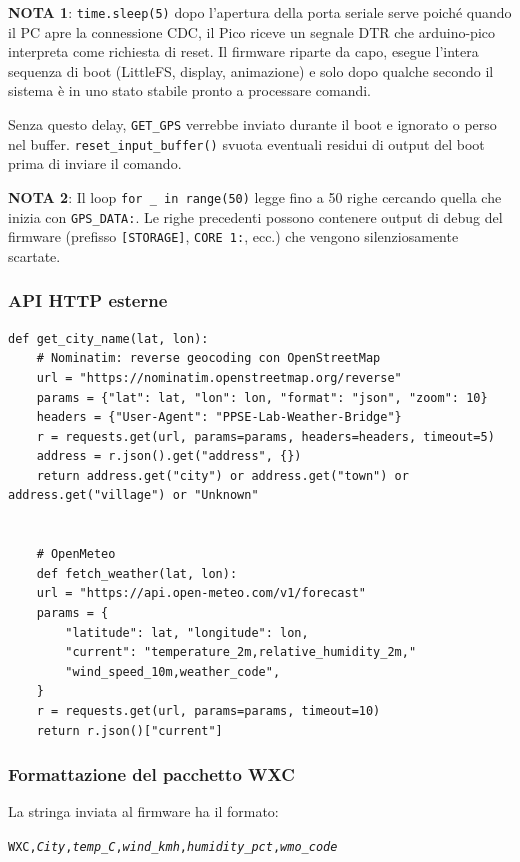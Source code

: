\textbf{NOTA 1}: \texttt{time.sleep(5)} dopo l'apertura della porta seriale serve poiché
quando il PC apre la connessione CDC, il Pico riceve un segnale DTR che
arduino-pico interpreta come richiesta di reset. Il firmware riparte da capo,
esegue l'intera sequenza di boot (LittleFS, display, animazione) e solo dopo
qualche secondo il sistema è in uno stato stabile pronto a processare comandi.


Senza questo delay, \texttt{GET\_GPS} verrebbe inviato durante il boot e
ignorato o perso nel buffer.
\texttt{reset\_input\_buffer()} svuota
eventuali residui di output del boot prima di inviare il comando.


\textbf{NOTA 2}: Il loop \texttt{for \_ in range(50)} legge fino a 50 righe cercando quella
che inizia con \texttt{GPS\_DATA:}. Le righe precedenti possono contenere
output di debug del firmware (prefisso \texttt{[STORAGE]}, \texttt{CORE 1:},
ecc.) che vengono silenziosamente scartate. 

\subsubsection{API HTTP esterne}

\begin{lstlisting}[style=py, caption={pcb\_bridge.py --- geocoding e meteo}]
	def get_city_name(lat, lon):
	# Nominatim: reverse geocoding con OpenStreetMap
	url = "https://nominatim.openstreetmap.org/reverse"
	params = {"lat": lat, "lon": lon, "format": "json", "zoom": 10}
	headers = {"User-Agent": "PPSE-Lab-Weather-Bridge"}
	r = requests.get(url, params=params, headers=headers, timeout=5)
	address = r.json().get("address", {})
	return address.get("city") or address.get("town") or address.get("village") or "Unknown"
	
	
	# OpenMeteo
	def fetch_weather(lat, lon):
	url = "https://api.open-meteo.com/v1/forecast"
	params = {
		"latitude": lat, "longitude": lon,
		"current": "temperature_2m,relative_humidity_2m,"
		"wind_speed_10m,weather_code",
	}
	r = requests.get(url, params=params, timeout=10)
	return r.json()["current"]
\end{lstlisting}


\subsubsection{Formattazione del pacchetto WXC}

La stringa inviata al firmware ha il formato:
\begin{center}
	\texttt{WXC,\textit{City},\textit{temp\_C},\textit{wind\_kmh},\textit{humidity\_pct},\textit{wmo\_code}}
\end{center}



